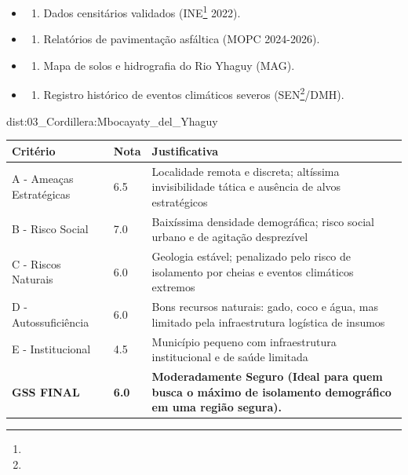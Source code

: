 {\begin{itemize}
\tightlist
\item
  \begin{enumerate}
  \def\labelenumi{\arabic{enumi})}
  \tightlist
  \item
    Dados censitários validados (INE\footnote{\fineINE} 2022).
  \end{enumerate}
\item
  \begin{enumerate}
  \def\labelenumi{\arabic{enumi})}
  \setcounter{enumi}{1}
  \tightlist
  \item
    Relatórios de pavimentação asfáltica (MOPC 2024-2026).
  \end{enumerate}
\item
  \begin{enumerate}
  \def\labelenumi{\arabic{enumi})}
  \setcounter{enumi}{2}
  \tightlist
  \item
    Mapa de solos e hidrografia do Rio Yhaguy (MAG).
  \end{enumerate}
\item
  \begin{enumerate}
  \def\labelenumi{\arabic{enumi})}
  \setcounter{enumi}{3}
  \tightlist
  \item
    Registro histórico de eventos climáticos severos (SEN\footnote{\fineSEN}/\allowbreak DMH).
  \end{enumerate}
\end{itemize}}{dist:03_Cordillera:Mbocayaty_del_Yhaguy}
\begin{table}[ht!]
\small \begin{tabular}{p{3.0cm}p{0.8cm}p{6.0cm}} \toprule
\textbf{Critério} & \textbf{Nota} & \textbf{Justificativa} \\ \midrule
A - Ameaças Estratégicas & 6.5 & Localidade remota e discreta; altíssima invisibilidade tática e ausência de alvos estratégicos \\
B - Risco Social & 7.0 & Baixíssima densidade demográfica; risco social urbano e de agitação desprezível \\
C - Riscos Naturais & 6.0 & Geologia estável; penalizado pelo risco de isolamento por cheias e eventos climáticos extremos \\
D - Autossuficiência & 6.0 & Bons recursos naturais: gado, coco e água, mas limitado pela infraestrutura logística de insumos \\
E - Institucional & 4.5 & Município pequeno com infraestrutura institucional e de saúde limitada \\
\midrule \textbf{GSS FINAL} & \textbf{6.0} & \textbf{Moderadamente Seguro (Ideal para quem busca o máximo de isolamento demográfico em uma região segura).} \\ \bottomrule \end{tabular}
\end{table}
